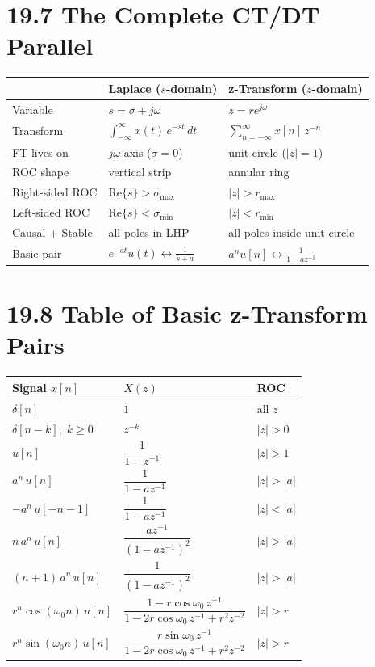 \documentclass[11pt]{article}
\begin{document}
\section*{19.7 The Complete CT/DT Parallel}

\begin{center}
\begin{tabular}{|l|l|l|}
\hline
\textbf{} & \textbf{\textbf{Laplace ($s$-domain)}} & \textbf{\textbf{z-Transform ($z$-domain)}} \\
\hline
Variable & $s = \sigma + j\omega$ & $z = r e^{j\omega}$ \\
\hline
Transform & $\displaystyle\int_{-\infty}^{\infty} x(t)\, e^{-st}\, dt$ & $\displaystyle\sum_{n=-\infty}^{\infty} x[n]\, z^{-n}$ \\
\hline
FT lives on & $j\omega$-axis ($\sigma = 0$) & unit circle ($|z| = 1$) \\
\hline
ROC shape & vertical strip & annular ring \\
\hline
Right-sided ROC & $\mathrm{Re}\{s\} > \sigma_{\max}$ & $|z| > r_{\max}$ \\
\hline
Left-sided ROC & $\mathrm{Re}\{s\} < \sigma_{\min}$ & $|z| < r_{\min}$ \\
\hline
Causal + Stable & all poles in LHP & all poles inside unit circle \\
\hline
Basic pair & $e^{-at} u(t) \leftrightarrow \frac{1}{s+a}$ & $a^n u[n] \leftrightarrow \frac{1}{1 - az^{-1}}$ \\
\hline
\end{tabular}
\end{center}

\section*{19.8 Table of Basic z-Transform Pairs}

\begin{center}
\begin{tabular}{|l|l|l|}
\hline
\textbf{Signal $x[n]$} & \textbf{$X(z)$} & \textbf{ROC} \\
\hline
$\delta[n]$ & $1$ & all $z$ \\
\hline
$\delta[n-k],\; k \geq 0$ & $z^{-k}$ & $|z| > 0$ \\
\hline
$u[n]$ & $\dfrac{1}{1 - z^{-1}}$ & $|z| > 1$ \\
\hline
$a^n\, u[n]$ & $\dfrac{1}{1 - az^{-1}}$ & $|z| > |a|$ \\
\hline
$-a^n\, u[-n-1]$ & $\dfrac{1}{1 - az^{-1}}$ & $|z| < |a|$ \\
\hline
$n\, a^n\, u[n]$ & $\dfrac{az^{-1}}{(1 - az^{-1})^2}$ & $|z| > |a|$ \\
\hline
$(n+1)\, a^n\, u[n]$ & $\dfrac{1}{(1 - az^{-1})^2}$ & $|z| > |a|$ \\
\hline
$r^n \cos(\omega_0 n)\, u[n]$ & $\dfrac{1 - r \cos\omega_0\, z^{-1}}{1 - 2 r \cos\omega_0\, z^{-1} + r^2 z^{-2}}$ & $|z| > r$ \\
\hline
$r^n \sin(\omega_0 n)\, u[n]$ & $\dfrac{r \sin\omega_0\, z^{-1}}{1 - 2 r \cos\omega_0\, z^{-1} + r^2 z^{-2}}$ & $|z| > r$ \\
\hline
\end{tabular}
\end{center}
\end{document}
